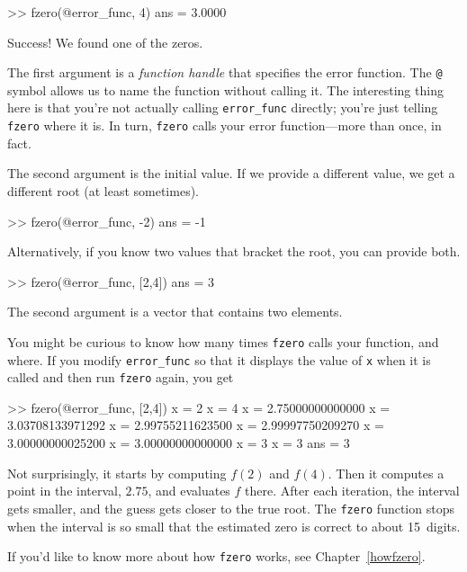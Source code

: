 \begin{code}
>> fzero(@error_func, 4)
ans = 3.0000
\end{code}

Success!  We found one of the zeros.

The first argument is a \emph{function handle} that specifies
the error function.  The \lstinline{@} symbol allows us to name the
function without calling it.  The interesting thing here is
that you're not actually calling \lstinline{error_func} directly;
you're just telling \lstinline{fzero} where it is.  In turn, \lstinline{fzero}
calls your error function---more than once, in fact.


The second argument is the initial value.  If we provide a different
value, we get a different root (at least sometimes).

\begin{code}
>> fzero(@error_func, -2)
ans = -1
\end{code}

Alternatively, if you know two values that bracket the root,
you can provide both.

\begin{code}
>> fzero(@error_func, [2,4])
ans = 3
\end{code}

The second argument is a vector that contains two elements.


You might be curious to know how many times \lstinline{fzero} calls your
function, and where.  If you modify \lstinline{error_func} so that it displays
the value of \lstinline{x} when it is called and then run \lstinline{fzero}
again, you get

\begin{code}
>> fzero(@error_func, [2,4])
x = 2
x = 4
x = 2.75000000000000
x = 3.03708133971292
x = 2.99755211623500
x = 2.99997750209270
x = 3.00000000025200
x = 3.00000000000000
x = 3
x = 3
ans = 3
\end{code}

Not surprisingly, it starts by computing $f(2)$ and $f(4)$.  Then it computes a point in the interval, $2.75$, and evaluates $f$ there.  After each iteration, the interval gets smaller, and the guess gets closer to the true root.
The \lstinline{fzero} function stops when the interval is so small that the estimated
zero is correct to about 15~digits.

If you'd like to know more about how \lstinline{fzero} works, see Chapter~\ref{howfzero}.


